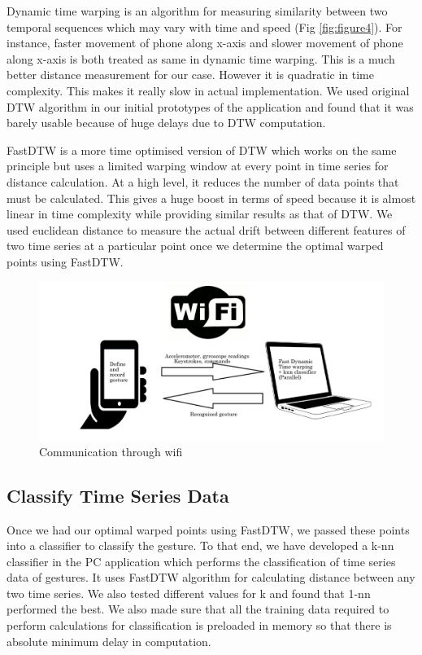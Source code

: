 \documentclass{sigchi}
\begin{document}
Dynamic time warping is an algorithm for measuring similarity between two temporal sequences which may vary with time and speed (Fig \ref{fig:figure4}). For instance, faster movement of phone along x-axis and slower movement of phone along x-axis is both treated as same in dynamic time warping. This is a much better distance measurement for our case. However it is quadratic in time complexity. This makes it really slow in actual implementation. We used original DTW algorithm in our initial prototypes of the application and found that it was barely usable because of huge delays due to DTW computation.

FastDTW \cite{fastdtw} is a more time optimised version of DTW which works on the same principle but uses a limited warping window at every point in time series for distance calculation. At a high level, it reduces the number of data points that must be calculated. This gives a huge boost in terms of speed because it is almost linear in time complexity while providing similar results as that of DTW. We used euclidean distance to measure the actual drift between different features of two time series at a particular point once we determine the optimal warped points using FastDTW.

\begin{figure}[t]
\centering
\includegraphics[width=2.0\columnwidth]{communicate}
\caption{Communication through wifi}
\label{fig:figure5}
\end{figure}

\subsection{Classify Time Series Data}

Once we had our optimal warped points using FastDTW, we passed these points into a classifier to classify the gesture. To that end, we have developed a k-nn classifier in the PC application which performs the classification of time series data of gestures. It uses FastDTW algorithm for calculating distance between any two time series. We also tested different values for k and found that 1-nn performed the best. We also made sure that all the training data required to perform calculations for classification is preloaded in memory so that there is absolute minimum delay in computation.
\end{document}
